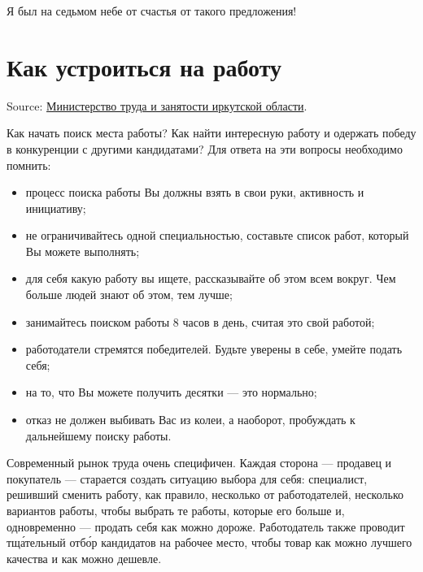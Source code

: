 Я был на седьмом небе от счастья от такого предложения!

\section{Как устроиться на работу}
Source: \href{http://irkzan.ru/home/gragd/soiskatel/soiskatelrabota.aspx}{Министерство труда и занятости иркутской области}.

Как начать поиск  места работы? Как найти интересную работу и одержать победу в конкуренции с другими кандидатами? Для ответа на эти вопросы необходимо помнить:

\begin{itemize}[noitemsep, label=--]
    \item процесс поиска работы Вы должны взять в свои руки,  активность и инициативу;
    \item не ограничивайтесь одной специальностью, составьте список работ, который Вы можете выполнять;
    \item {} для себя какую работу вы ищете, рассказывайте об этом всем вокруг. Чем больше людей знают об этом, тем лучше;
    \item занимайтесь поиском работы 8 часов в день, считая это свой работой;
    \item работодатели стремятся  победителей. Будьте уверены в себе, умейте подать себя;
    \item {} на то, что Вы можете получить десятки  --- это нормально;
    \item {} отказ не должен выбивать Вас из колеи, а наоборот, пробуждать к дальнейшему поиску работы.
\end{itemize}

Современный рынок труда очень специфичен. Каждая сторона --- продавец и покупатель --- старается создать ситуацию выбора для себя: специалист, решивший сменить работу, как правило,  несколько  от работодателей, несколько вариантов работы, чтобы выбрать те  работы, которые его больше  и, одновременно --- продать себя как можно дороже. Работодатель также проводит тщ\'{а}тельный отб\'{о}р кандидатов на рабочее место, чтобы  товар как можно лучшего качества и как можно дешевле.

